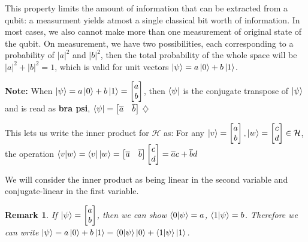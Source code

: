 \documentclass[12pt,twoside,fleqn]{report}
\theoremstyle{thmstyle}
\newtheorem{remark}{Remark}[chapter]
\newenvironment{note}{\textbf{Note:}}{\hfill\ensuremath{\diamondsuit}}
\begin{document}
This property limits the amount of information that can be extracted from a qubit: a measurment yields atmost a single classical bit worth of information. In most cases, we also cannot make more than one measurement of original state of the qubit. On measurement, we have two possibilities, each corresponding to a probability of $|a|^2$ and $|b|^2$, then the total probability of the whole space will be $|a|^2 + |b|^2 = 1$, which is valid for unit vectors $\ket{\psi} = a \ket{0} + b \ket{1}$.

\begin{note}
    When $\ket{\psi} = a \ket{0} + b \ket{1} = \begin{bmatrix} a \\ b \end{bmatrix}$, then $\bra{\psi}$ is the conjugate transpose of $\ket{\psi}$ and is read as \textbf{bra psi}, $\bra{\psi} = \begin{bmatrix} \overline{a} & \overline{b}\end{bmatrix}$
\end{note}

This lets us write the inner product for $\mathcal{H}$ as:
For any $\ket{v} = \begin{bmatrix} a \\ b \end{bmatrix}, \ket{w} = \begin{bmatrix} c \\ d \end{bmatrix} \in \mathcal{H}$, the operation $\braket{v|w} = \bra{v}\ket{w} = \begin{bmatrix} \overline{a} & \overline{b} \end{bmatrix} \begin{bmatrix} c \\ d \end{bmatrix} = \overline{a} c + \overline{b} d $

We will consider the inner product as being linear in the second variable and conjugate-linear in the first variable.

\begin{remark}
If $\ket{\psi} = \begin{bmatrix} a \\ b \end{bmatrix}$, then we can show $\braket{0|\psi} = a$, $\braket{1|\psi} = b$.
Therefore we can write $\ket{\psi} = a \ket{0} + b \ket{1} = \braket{0|\psi} \ket{0} + \braket{1|\psi} \ket{1}$.
\end{remark}
\end{document}
